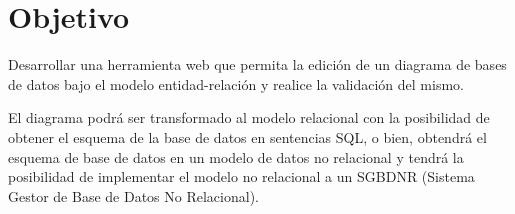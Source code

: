 \section{Objetivo}
Desarrollar una herramienta web que permita la edición de un diagrama de bases de datos bajo el modelo entidad-relación y realice la validación del mismo.


El diagrama podrá ser transformado al modelo relacional con la posibilidad de obtener el esquema de la base de datos en sentencias SQL, o bien, obtendrá el esquema de base de datos en un modelo de datos no relacional y tendrá la posibilidad de implementar el modelo no relacional a un SGBDNR (Sistema Gestor de Base de Datos No Relacional).

